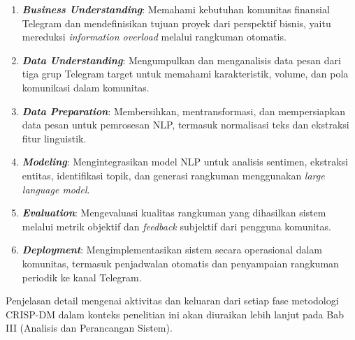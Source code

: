 \begin{enumerate}
\item \textbf{\textit{Business Understanding}}: Memahami kebutuhan komunitas finansial Telegram dan mendefinisikan tujuan proyek dari perspektif bisnis, yaitu mereduksi \textit{information overload} melalui rangkuman otomatis.

\item \textbf{\textit{Data Understanding}}: Mengumpulkan dan menganalisis data pesan dari tiga grup Telegram target untuk memahami karakteristik, volume, dan pola komunikasi dalam komunitas.

\item \textbf{\textit{Data Preparation}}: Membersihkan, mentransformasi, dan mempersiapkan data pesan untuk pemrosesan NLP, termasuk normalisasi teks dan ekstraksi fitur linguistik.

\item \textbf{\textit{Modeling}}: Mengintegrasikan model NLP untuk analisis sentimen, ekstraksi entitas, identifikasi topik, dan generasi rangkuman menggunakan \textit{large language model}.

\item \textbf{\textit{Evaluation}}: Mengevaluasi kualitas rangkuman yang dihasilkan sistem melalui metrik objektif dan \textit{feedback} subjektif dari pengguna komunitas.

\item \textbf{\textit{Deployment}}: Mengimplementasikan sistem secara operasional dalam komunitas, termasuk penjadwalan otomatis dan penyampaian rangkuman periodik ke kanal Telegram.
\end{enumerate}

Penjelasan detail mengenai aktivitas dan keluaran dari setiap fase metodologi CRISP-DM dalam konteks penelitian ini akan diuraikan lebih lanjut pada Bab III (Analisis dan Perancangan Sistem).
